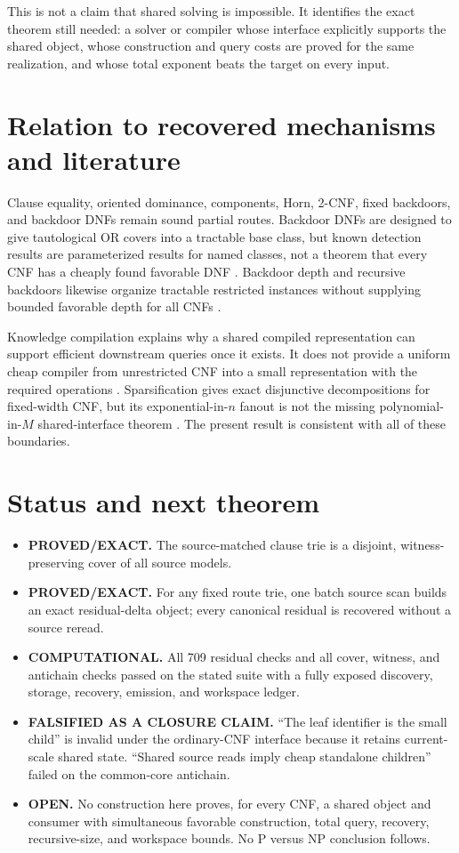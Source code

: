 \documentclass[11pt]{article}
\begin{document}
This is not a claim that shared solving is impossible.  It identifies the
exact theorem still needed: a solver or compiler whose interface explicitly
supports the shared object, whose construction and query costs are proved for
the same realization, and whose total exponent beats the target on every
input.

\section{Relation to recovered mechanisms and literature}

Clause equality, oriented dominance, components, Horn, 2-CNF, fixed
backdoors, and backdoor DNFs remain sound partial routes.  Backdoor DNFs are
designed to give tautological OR covers into a tractable base class, but known
detection results are parameterized results for named classes, not a theorem
that every CNF has a cheaply found favorable DNF \cite{ordyniak2021bdnf}.
Backdoor depth and recursive backdoors likewise organize tractable restricted
instances without supplying bounded favorable depth for all CNFs
\cite{dreier2022,maehlmann2021}.

Knowledge compilation explains why a shared compiled representation can
support efficient downstream queries once it exists.  It does not provide a
uniform cheap compiler from unrestricted CNF into a small representation
with the required operations \cite{darwiche2002}.  Sparsification gives exact
disjunctive decompositions for fixed-width CNF, but its exponential-in-$n$
fanout is not the missing polynomial-in-$M$ shared-interface theorem
\cite{ipz2001,calabro2010}.  The present result is consistent with all of
these boundaries.

\section{Status and next theorem}

\begin{itemize}
\item[] \textbf{PROVED/EXACT.}  The source-matched clause trie is a disjoint,
witness-preserving cover of all source models.
\item[] \textbf{PROVED/EXACT.}  For any fixed route trie, one batch source
scan builds an exact residual-delta object; every canonical residual is
recovered without a source reread.
\item[] \textbf{COMPUTATIONAL.}  All 709 residual checks and all cover,
witness, and antichain checks passed on the stated suite with a fully exposed
discovery, storage, recovery, emission, and workspace ledger.
\item[] \textbf{FALSIFIED AS A CLOSURE CLAIM.}  ``The leaf identifier is the
small child'' is invalid under the ordinary-CNF interface because it retains
current-scale shared state.  ``Shared source reads imply cheap standalone
children'' failed on the common-core antichain.
\item[] \textbf{OPEN.}  No construction here proves, for every CNF, a shared
object and consumer with simultaneous favorable construction, total query,
recovery, recursive-size, and workspace bounds.  No P versus NP conclusion
follows.
\end{itemize}
\end{document}
